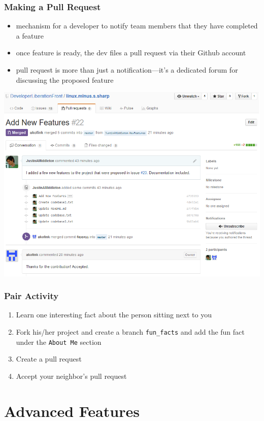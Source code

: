 \documentclass[12pt]{beamer}
\begin{document}
\begin{frame}
\frametitle{Making a Pull Request}
\begin{itemize}
	\item mechanism for a developer to notify team members that they have completed a feature
	\item once feature is ready, the dev files a pull request via their Github account
	\item pull request is more than just a notification—it’s a dedicated forum for discussing the proposed feature
\end{itemize}
\begin{center}
	\includegraphics[width=0.8\linewidth]{pull_request_example}
\end{center}
\end{frame}

\begin{frame}
\frametitle{Pair Activity}
\begin{enumerate}
	\item Learn one interesting fact about the person sitting next to you
	\item Fork his/her project and create a branch \texttt{fun\_facts} and add the fun fact under the \texttt{About Me} section
	\item Create a pull request
	\item Accept your neighbor's pull request
\end{enumerate}
\end{frame}

\section{Advanced Features}
\end{document}
